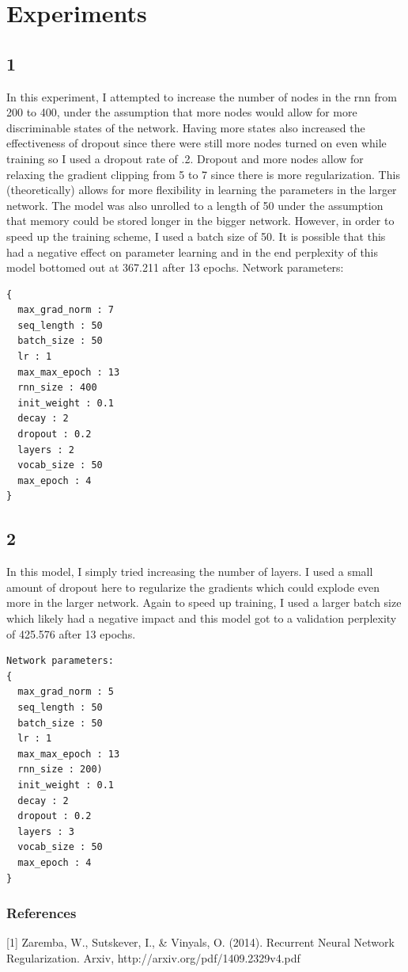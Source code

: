 \documentclass{article} %
\begin{document}
\section{Experiments}
\subsection{1} 
In this experiment, I attempted to increase the number of nodes in the rnn from 200 to 400, under the assumption that more nodes would allow for more discriminable states of the network. Having more states also increased the effectiveness of dropout since there were still more nodes turned on even while training so I used a dropout rate of .2. Dropout and more nodes allow for relaxing the gradient clipping from 5 to 7 since there is more regularization. This (theoretically) allows for more flexibility in learning the parameters in the larger network. The model was also unrolled to a length of 50 under the assumption that memory could be stored longer in the bigger network. However, in order to speed up the training scheme, I used a batch size of 50. It is possible that this had a negative effect on parameter learning and in the end perplexity of this model bottomed out at 367.211 after 13 epochs. 
Network parameters:	
\begin{Verbatim}
{
  max_grad_norm : 7
  seq_length : 50
  batch_size : 50
  lr : 1
  max_max_epoch : 13
  rnn_size : 400
  init_weight : 0.1
  decay : 2
  dropout : 0.2
  layers : 2
  vocab_size : 50
  max_epoch : 4
}
\end{Verbatim}

\subsection{2}
In this model, I simply tried increasing the number of layers. I used a small amount of dropout here to regularize the gradients which could explode even more in the larger network. Again to speed up training, I used a larger batch size which likely had a negative impact and this model got to a validation perplexity of 425.576 after 13 epochs.
\begin{Verbatim}
Network parameters:	
{
  max_grad_norm : 5
  seq_length : 50
  batch_size : 50
  lr : 1
  max_max_epoch : 13
  rnn_size : 200)
  init_weight : 0.1
  decay : 2
  dropout : 0.2
  layers : 3
  vocab_size : 50
  max_epoch : 4
}
\end{Verbatim}

\subsubsection*{References}

\small{
[1] Zaremba, W., Sutskever, I., \& Vinyals, O. (2014). Recurrent Neural Network Regularization. Arxiv, http://arxiv.org/pdf/1409.2329v4.pdf
}
\end{document}
